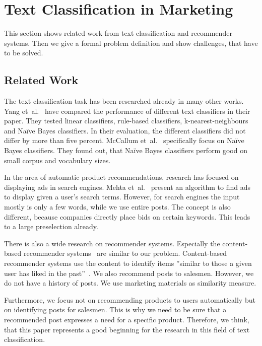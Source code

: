 
\section{Text Classification in Marketing}
\label{sec:background}

This section shows related work from text classification and recommender systems.
Then we give a formal problem definition and show challenges, that have to be solved.

\subsection{Related Work}
The text classification task has been researched already in many other works.
Yang et~al.~\cite{yang1999re} have compared the performance of different text classifiers in their paper.
They tested linear classifiers, rule-based classifiers, k-nearest-neighbours and Na\"ive Bayes classifiers.
In their evaluation, the different classifiers did not differ by more than five percent.
McCallum et~al.~\cite{mccallum1998comparison} specifically focus on Na\"ive Bayes classifiers.
They found out, that Na\"ive Bayes classifiers perform good on small corpus and vocabulary sizes.

In the area of automatic product recommendations, research has focused on displaying ads in search engines.
Mehta et~al.~\cite{mehta2007adwords} present an algorithm to find ads to display given a user's search terms.
However, for search engines the input mostly is only a few words, while we use entire posts.
The concept is also different, because companies directly place bids on certain keywords.
This leads to a large preselection already.

There is also a wide research on recommender systems. 
Especially the content-based recommender systems~\cite{lops2011content} are similar to our problem.
Content-based recommender systems use the content to identify items ''similar to those a given user has liked in the past''~\cite{lops2011content}.
We also recommend posts to salesmen.
However, we do not have a history of posts.
We use marketing materials as similarity measure.

Furthermore, we focus not on recommending products to users automatically but on identifying posts for salesmen.
This is why we need to be sure that a recommended post expresses a need for a specific product.
Therefore, we think, that this paper represents a good beginning for the research in this field of text classification.


